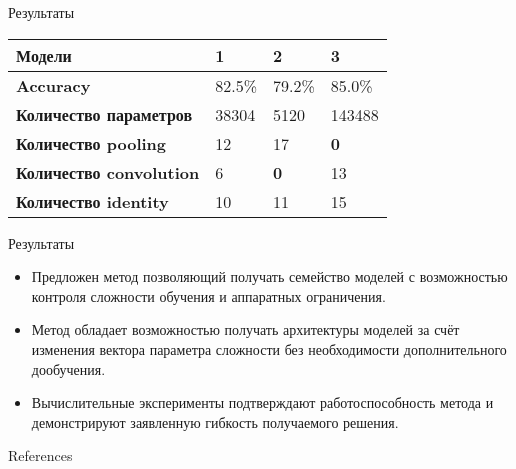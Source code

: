 \documentclass{beamer}
\begin{document}
\begin{frame}[t]{Результаты}
\begin{minipage}[t][0.35\textheight]{\textwidth}
  \begin{table}[h!]
    \centering
    \small
    \begin{tabular}{b{4.5cm}|b{1cm}|m{1cm}|m{1cm}||}
    \hline
     \textbf{Модели} & 1 & 2 & 3 \\
    \hline
    \hline
    \textbf{Accuracy} &  82.5\% & 79.2\% &  85.0\% \\
    \hline
    \textbf{Количество параметров} & 38304 & 5120 & 143488 \\
    \hline
    \textbf{Количество pooling} & 12 & 17 & \textbf{0} \\
    \hline
    \textbf{Количество convolution} & 6 & \textbf{0} & 13 \\
    \hline
    \textbf{Количество identity} & 10 & 11 & 15 \\
    \hline
    \end{tabular}
  \end{table}
\end{minipage}

\end{frame}




\begin{frame}{Результаты}
\begin{itemize}
    \item Предложен метод позволяющий получать семейство моделей с возможностью контроля сложности обучения и аппаратных ограничения.
    \item Метод обладает возможностью получать архитектуры моделей за счёт изменения вектора параметра сложности без необходимости дополнительного дообучения.
    \item Вычислительные эксперименты подтверждают работоспособность метода и демонстрируют заявленную гибкость получаемого решения.
\end{itemize}
\end{frame}


\begin{frame}[allowframebreaks]{References}
    \tiny
    \nocite{*}
    \printbibliography
\end{frame}
\end{document}
